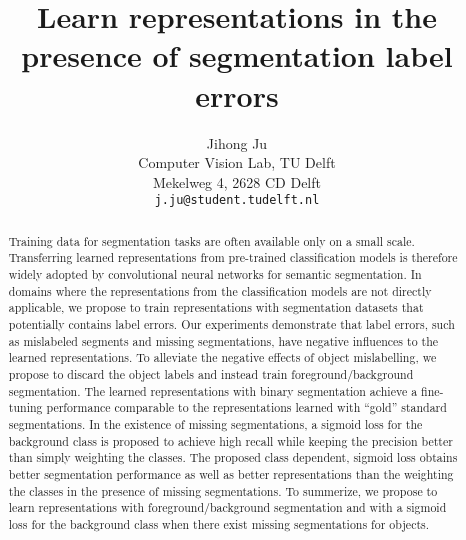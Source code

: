 \documentclass[10pt,twocolumn,letterpaper]{article}
\begin{document}
\onecolumn
{}
% 

\twocolumn
{}
\newpage
\title{Learn representations in the presence of segmentation label errors}

\author{Jihong Ju\\
Computer Vision Lab, TU Delft \\
Mekelweg 4, 2628 CD Delft\\
{\tt\small j.ju@student.tudelft.nl}
}

\maketitle


\begin{abstract}

Training data for segmentation tasks are often available only on a small scale.
Transferring learned representations from pre-trained classification models is therefore widely adopted by convolutional neural networks for semantic segmentation.
In domains where the representations from the classification models are not directly applicable, we propose to train representations with segmentation datasets that potentially contains label errors.
Our experiments demonstrate that label errors, such as mislabeled segments and missing segmentations, have negative influences to the learned representations.
To alleviate the negative effects of object mislabelling, we propose to discard the object labels and instead train foreground/background segmentation.
The learned representations with binary segmentation achieve a fine-tuning performance comparable to the representations learned with ``gold'' standard segmentations.
In the existence of missing segmentations, a sigmoid loss for the background class is proposed to achieve high recall while keeping the precision better than simply weighting the classes.
The proposed class dependent, sigmoid loss obtains better segmentation performance as well as better representations than the weighting the classes in the presence of missing segmentations.
To summerize, we propose to learn representations with foreground/background segmentation and with a sigmoid loss for the background class when there exist missing segmentations for objects.

%

\end{abstract}
\end{document}

